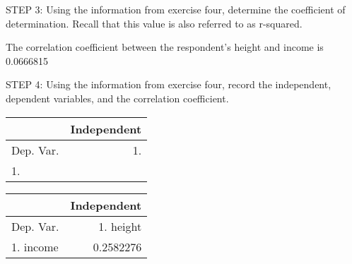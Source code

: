 \documentclass[11pt]{book}\usepackage[]{graphicx}\usepackage[]{color}
\begin{document}
\begin{exercises}
\begin{exercise}
    STEP 3: Using the information from exercise four, determine the coefficient of determination.  Recall that this value is also referred to as r-squared.

    \vspace{5mm}

    \end{exercise}
    \begin{solution}    %

       The correlation coefficient between the respondent's height and income is 0.0666815

    \end{solution}

  \begin{exercise} %

    STEP 4: Using the information from exercise four, record the independent, dependent variables, and the correlation coefficient.

{\scriptsize{
    \begin{table}[ht]
    \centering
    \begin{tabular}{lr} \hline
        &  \multicolumn{1}{c}{Independent} \\ \hline

    Dep. Var. & 1. \underline{\phantom{xxxxxxxx}}      \\ \hline
    1. \underline{\phantom{xxxxxxxx}}  &  \underline{\phantom{xxxxxxxx}}       \\ \hline

    \end{tabular}
    \end{table}
}}


    \end{exercise}
    \begin{solution}    %

       \begin{table}[ht]
    \centering
    \begin{tabular}{lr} \hline
        &  \multicolumn{1}{c}{Independent} \\ \hline

    Dep. Var. & 1. height      \\ \hline
    1. income  &   0.2582276      \\ \hline

    \end{tabular}
    \end{table}


\end{solution}
\end{exercises}
\end{document}
